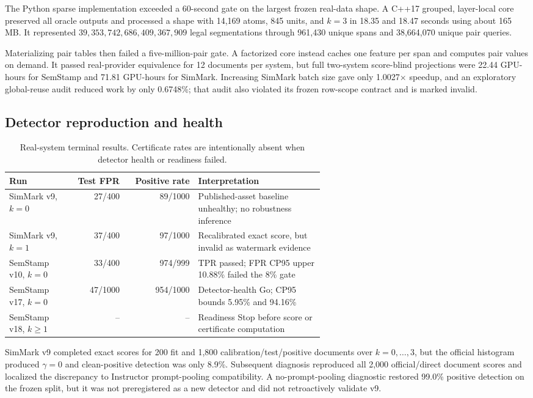 \documentclass[10pt]{article}
\begin{document}
The Python sparse implementation exceeded a 60-second gate on the largest
frozen real-data shape. A C++17 grouped, layer-local core preserved all oracle
outputs and processed a shape with 14,169 atoms, 845 units, and $k=3$ in
18.35 and 18.47 seconds using about 165 MB. It represented
$39{,}353{,}742{,}686{,}409{,}367{,}909$ legal segmentations through
961,430 unique spans and 38,664,070 unique pair queries.

Materializing pair tables then failed a five-million-pair gate. A factorized
core instead caches one feature per span and computes pair values on demand.
It passed real-provider equivalence for 12 documents per system, but full
two-system score-blind projections were 22.44 GPU-hours for SemStamp and
71.81 GPU-hours for SimMark. Increasing SimMark batch size gave only
1.0027$\times$ speedup, and an exploratory global-reuse audit reduced work by
only 0.6748\%; that audit also violated its frozen row-scope contract and is
marked invalid.

\subsection{Detector reproduction and health}

\begin{table}[t]
\caption{Real-system terminal results. Certificate rates are intentionally
absent when detector health or readiness failed.}
\label{tab:systems}
\centering
\small
\begin{tabular}{p{0.20\linewidth}rrp{0.40\linewidth}}
\toprule
Run & Test FPR & Positive rate & Interpretation \\
\midrule
SimMark v9, $k=0$ & 27/400 & 89/1000 &
Published-asset baseline unhealthy; no robustness inference \\
SimMark v9, $k=1$ & 37/400 & 97/1000 &
Recalibrated exact score, but invalid as watermark evidence \\
SemStamp v10, $k=0$ & 33/400 & 974/999 &
TPR passed; FPR CP95 upper 10.88\% failed the 8\% gate \\
SemStamp v17, $k=0$ & 47/1000 & 954/1000 &
Detector-health Go; CP95 bounds 5.95\% and 94.16\% \\
SemStamp v18, $k\geq1$ & -- & -- &
Readiness Stop before score or certificate computation \\
\bottomrule
\end{tabular}
\end{table}

SimMark v9 completed exact scores for 200 fit and 1,800
calibration/test/positive documents over $k=0,\ldots,3$, but the official
histogram produced $\gamma=0$ and clean-positive detection was only 8.9\%.
Subsequent diagnosis reproduced all 2,000 official/direct document scores and
localized the discrepancy to Instructor prompt-pooling compatibility. A
no-prompt-pooling diagnostic restored 99.0\% positive detection on the frozen
split, but it was not preregistered as a new detector and did not retroactively
validate v9.
\end{document}
